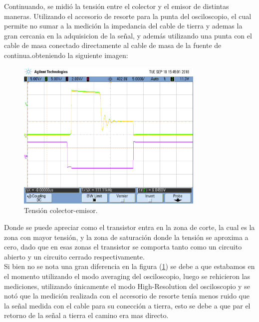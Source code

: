 Continuando, se midió la tensión entre el colector y el emisor de distintas maneras. Utilizando el accesorio de resorte para la punta del osciloscopio, el cual permite no sumar a la medición la impedancia del cable de tierra y ademas la gran cercania en la adquisicion de la señal,  y además utilizando una punta con el cable de masa conectado directamente al cable de masa de la fuente de continua.obteniendo la siguiente imagen:
\begin{figure}[H]
	\centering
	\includegraphics[width=0.8\textwidth]{Imagenes/vce_pe_both.png}
\caption{Tensión colector-emisor.}
	\label{fig:vce}
\end{figure}
Donde se puede apreciar como el transistor entra en la zona de corte, la cual es la zona con mayor tensión, y la zona de saturación donde la tensión se aproxima a cero, dado que en esas zonas el transistor se comporta tanto como un circuito abierto y un circuito cerrado respectivamente.\\Si bien no se nota una gran  diferencia  en la figura (\ref{fig:vce}) se debe a que estabamos en el momento utilizando el modo averaging del osciloscopio, luego se rehicieron las mediciones, utilizando únicamente el modo High-Resolution del osciloscopio y se notó que la medición realizada con el accesorio de resorte tenía menos ruido que la señal medida con el cable para su conección a tierra, esto se debe a que par el retorno de la señal a tierra el camino era mas directo. 


